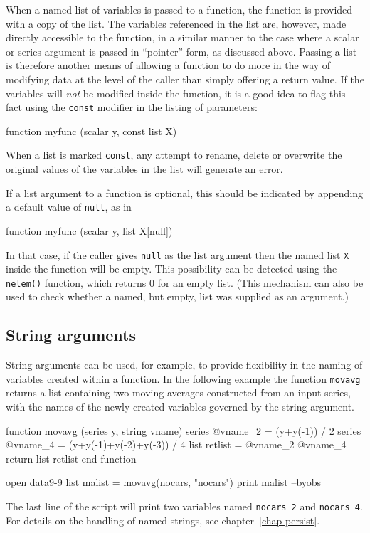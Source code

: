 When a named list of variables is passed to a function, the function
is provided with a copy of the list.  The variables referenced in the
list are, however, made directly accessible to the function, in a
similar manner to the case where a scalar or series argument is passed
in ``pointer'' form, as discussed above.  Passing a list is therefore
another means of allowing a function to do more in the way of
modifying data at the level of the caller than simply offering a
return value.  If the variables will \textit{not} be modified inside
the function, it is a good idea to flag this fact using the
\texttt{const} modifier in the listing of parameters:
%
\begin{code}
function myfunc (scalar y, const list X)
\end{code}
%
When a list is marked \texttt{const}, any attempt to rename, delete
or overwrite the original values of the variables in the list will
generate an error.

If a list argument to a function is optional, this should be indicated
by appending a default value of \texttt{null}, as in
%
\begin{code}
function myfunc (scalar y, list X[null])
\end{code}
%
In that case, if the caller gives \texttt{null} as the list argument
then the named list \texttt{X} inside the function will be empty.
This possibility can be detected using the \texttt{nelem()} function,
which returns 0 for an empty list.  (This mechanism can also be used
to check whether a named, but empty, list was supplied as an
argument.)

\subsection{String arguments}

String arguments can be used, for example, to provide flexibility in
the naming of variables created within a function.  In the following
example the function \texttt{movavg} returns a list containing two
moving averages constructed from an input series, with the names of
the newly created variables governed by the string argument.
%
\begin{code}
function movavg (series y, string vname)
   series @vname_2 = (y+y(-1)) / 2
   series @vname_4 = (y+y(-1)+y(-2)+y(-3)) / 4
   list retlist = @vname_2 @vname_4
   return list retlist
end function

open data9-9
list malist = movavg(nocars, "nocars")
print malist --byobs
\end{code}
%
The last line of the script will print two variables named
\verb|nocars_2| and \verb|nocars_4|.  For details on the handling of
named strings, see chapter~\ref{chap-persist}.

